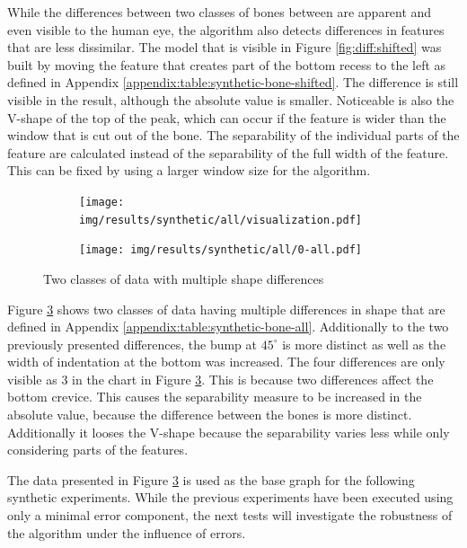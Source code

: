 \documentclass[pdftex,12pt,a4paper]{report}
\begin{document}
While the differences between two classes of bones between are apparent and even visible to the human eye, the algorithm also detects differences in features that are less dissimilar. The model that is visible in Figure \ref{fig:diff:shifted} was built by moving the feature that creates part of the bottom recess to the left as defined in Appendix \ref{appendix:table:synthetic-bone-shifted}. The difference is still visible in the result, although the absolute value is smaller. Noticeable is also the V-shape of the top of the peak, which can occur if the feature is wider than the window that is cut out of the bone. The separability of the individual parts of the feature are calculated instead of the separability of the full width of the feature. This can be fixed by using a larger window size for the algorithm.

\begin{figure}[h]
	\centering
	\begin{subfigure}[b]{0.45\textwidth}
		\centering
		\texttt{[image: img/results/synthetic/all/visualization.pdf]}
		\subcaption*{}
		\label{fig:diff:all}
	\end{subfigure}
	\begin{subfigure}[b]{0.45\textwidth}
		\centering
		\texttt{[image: img/results/synthetic/all/0-all.pdf]}
		\subcaption*{}
		\label{}
	\end{subfigure}
	\caption{Two classes of data with multiple shape differences}
	\label{fig:all}
\end{figure}

Figure \ref{fig:all} shows two classes of data having multiple differences in shape that are defined in Appendix \ref{appendix:table:synthetic-bone-all}. Additionally to the two previously presented differences, the bump at $45^\circ$ is more distinct as well as the width of indentation at the bottom was increased. The four differences are only visible as 3 in the chart in Figure \ref{fig:all}. This is because two differences affect the bottom crevice. This causes the separability measure to be increased in the absolute value, because the difference between the bones is more distinct. Additionally it looses the V-shape because the separability varies less while only considering parts of the features.

The data presented in Figure \ref{fig:all} is used as the base graph for the following synthetic experiments. While the previous experiments have been executed using only a minimal error component, the next tests will investigate the robustness of the algorithm under the influence of errors.
\end{document}
